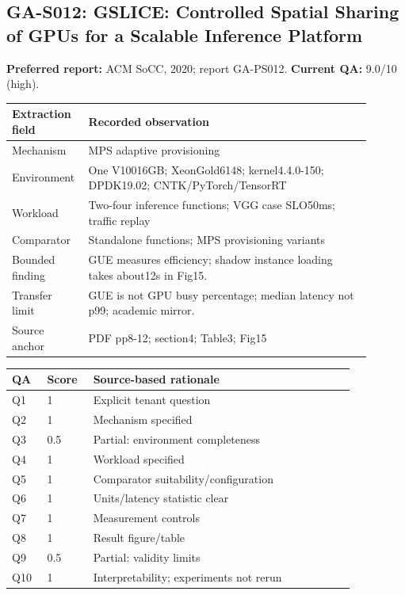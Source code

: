 \subsection{GA-S012: GSLICE: Controlled Spatial Sharing of GPUs for a Scalable Inference Platform}
\textbf{Preferred report:} ACM SoCC, 2020; report GA-PS012. \textbf{Current QA:} 9.0/10 (high).
\begin{longtable}{P{0.15\linewidth}P{0.75\linewidth}}
\toprule Extraction field & Recorded observation\\\midrule\endhead
Mechanism & MPS adaptive provisioning\\
Environment & One V10016GB; XeonGold6148; kernel4.4.0-150; DPDK19.02; CNTK/PyTorch/TensorRT\\
Workload & Two-four inference functions; VGG case SLO50ms; traffic replay\\
Comparator & Standalone functions; MPS provisioning variants\\
Bounded finding & GUE measures efficiency; shadow instance loading takes about12s in Fig15.\\
Transfer limit & GUE is not GPU busy percentage; median latency not p99; academic mirror.\\
Source anchor & PDF pp8-12; section4; Table3; Fig15\\
\bottomrule\end{longtable}
\begin{longtable}{P{0.09\linewidth}P{0.10\linewidth}P{0.67\linewidth}}
\toprule QA & Score & Source-based rationale\\\midrule\endhead
Q1 & 1 & Explicit tenant question\\
Q2 & 1 & Mechanism specified\\
Q3 & 0.5 & Partial: environment completeness\\
Q4 & 1 & Workload specified\\
Q5 & 1 & Comparator suitability/configuration\\
Q6 & 1 & Units/latency statistic clear\\
Q7 & 1 & Measurement controls\\
Q8 & 1 & Result figure/table\\
Q9 & 0.5 & Partial: validity limits\\
Q10 & 1 & Interpretability; experiments not rerun\\
\bottomrule\end{longtable}


